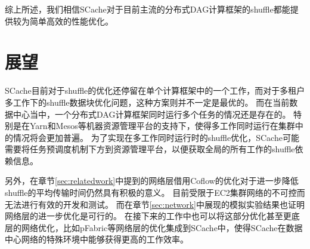 综上所述，我们相信SCache对于目前主流的分布式DAG计算框架的shuffle都能提供较为简单高效的性能优化。

\section{展望}

SCache目前对于shuffle的优化还停留在单个计算框架中的一个工作，而对于多租户多工作下的shuffle数据块优化问题，这种方案则并不一定是最优的。
而在当前数据中心当中，一个分布式DAG计算框架同时运行多个任务的情况还是存在的。
特别是在Yarn\cite{yarn}和Mesos\cite{mesos}等机器资源管理平台的支持下，使得多工作同时运行在集群中的情况将会更加普遍。
为了实现在多工作同时运行时的shuffle优化，SCache可能需要将任务预调度机制下方到资源管理平台，以便获取全局的所有工作的shuffle依赖信息。

另外，在章节\ref{sec:relatedwork}中提到的网络层借用Coflow的优化对于进一步降低shuffle的平均传输时间仍然具有积极的意义。
目前受限于EC2集群网络的不可控而无法进行有效的开发和测试。
而在章节\ref{sec:network}中展现的模拟实验结果也证明网络层的进一步优化是可行的。
在接下来的工作中也可以将这部分优化甚至更底层的网络优化，比如pFabric\cite{pfabric}等网络层的优化集成到SCache中，使得SCache在数据中心网络的特殊环境中能够获得更高的工作效率。



